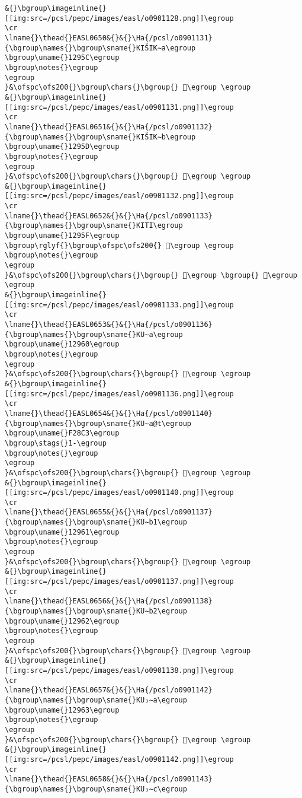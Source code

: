 \begin{verbatim}
&{}\bgroup\imageinline{}[[img:src=/pcsl/pepc/images/easl/o0901128.png]]\egroup
\cr
\lname{}\thead{}EASL0650&{}&{}\Ha{/pcsl/o0901131}{\bgroup\names{}\bgroup\sname{}KIŠIK∼a\egroup
\bgroup\uname{}1295C\egroup
\bgroup\notes{}\egroup
\egroup
}&\ofspc\ofs200{}\bgroup\chars{}\bgroup{} 𒥜\egroup \egroup
&{}\bgroup\imageinline{}[[img:src=/pcsl/pepc/images/easl/o0901131.png]]\egroup
\cr
\lname{}\thead{}EASL0651&{}&{}\Ha{/pcsl/o0901132}{\bgroup\names{}\bgroup\sname{}KIŠIK∼b\egroup
\bgroup\uname{}1295D\egroup
\bgroup\notes{}\egroup
\egroup
}&\ofspc\ofs200{}\bgroup\chars{}\bgroup{} 𒥝\egroup \egroup
&{}\bgroup\imageinline{}[[img:src=/pcsl/pepc/images/easl/o0901132.png]]\egroup
\cr
\lname{}\thead{}EASL0652&{}&{}\Ha{/pcsl/o0901133}{\bgroup\names{}\bgroup\sname{}KITI\egroup
\bgroup\uname{}1295F\egroup
\bgroup\rglyf{}\bgroup\ofspc\ofs200{} 𒥟\egroup \egroup
\bgroup\notes{}\egroup
\egroup
}&\ofspc\ofs200{}\bgroup\chars{}\bgroup{} 𒥞\egroup \bgroup{} 𒥟\egroup \egroup
&{}\bgroup\imageinline{}[[img:src=/pcsl/pepc/images/easl/o0901133.png]]\egroup
\cr
\lname{}\thead{}EASL0653&{}&{}\Ha{/pcsl/o0901136}{\bgroup\names{}\bgroup\sname{}KU∼a\egroup
\bgroup\uname{}12960\egroup
\bgroup\notes{}\egroup
\egroup
}&\ofspc\ofs200{}\bgroup\chars{}\bgroup{} 𒥠\egroup \egroup
&{}\bgroup\imageinline{}[[img:src=/pcsl/pepc/images/easl/o0901136.png]]\egroup
\cr
\lname{}\thead{}EASL0654&{}&{}\Ha{/pcsl/o0901140}{\bgroup\names{}\bgroup\sname{}KU∼a@t\egroup
\bgroup\uname{}F28C3\egroup
\bgroup\stags{}1-\egroup
\bgroup\notes{}\egroup
\egroup
}&\ofspc\ofs200{}\bgroup\chars{}\bgroup{} 󲣃\egroup \egroup
&{}\bgroup\imageinline{}[[img:src=/pcsl/pepc/images/easl/o0901140.png]]\egroup
\cr
\lname{}\thead{}EASL0655&{}&{}\Ha{/pcsl/o0901137}{\bgroup\names{}\bgroup\sname{}KU∼b1\egroup
\bgroup\uname{}12961\egroup
\bgroup\notes{}\egroup
\egroup
}&\ofspc\ofs200{}\bgroup\chars{}\bgroup{} 𒥡\egroup \egroup
&{}\bgroup\imageinline{}[[img:src=/pcsl/pepc/images/easl/o0901137.png]]\egroup
\cr
\lname{}\thead{}EASL0656&{}&{}\Ha{/pcsl/o0901138}{\bgroup\names{}\bgroup\sname{}KU∼b2\egroup
\bgroup\uname{}12962\egroup
\bgroup\notes{}\egroup
\egroup
}&\ofspc\ofs200{}\bgroup\chars{}\bgroup{} 𒥢\egroup \egroup
&{}\bgroup\imageinline{}[[img:src=/pcsl/pepc/images/easl/o0901138.png]]\egroup
\cr
\lname{}\thead{}EASL0657&{}&{}\Ha{/pcsl/o0901142}{\bgroup\names{}\bgroup\sname{}KU₃∼a\egroup
\bgroup\uname{}12963\egroup
\bgroup\notes{}\egroup
\egroup
}&\ofspc\ofs200{}\bgroup\chars{}\bgroup{} 𒥣\egroup \egroup
&{}\bgroup\imageinline{}[[img:src=/pcsl/pepc/images/easl/o0901142.png]]\egroup
\cr
\lname{}\thead{}EASL0658&{}&{}\Ha{/pcsl/o0901143}{\bgroup\names{}\bgroup\sname{}KU₃∼c\egroup

\end{verbatim}
